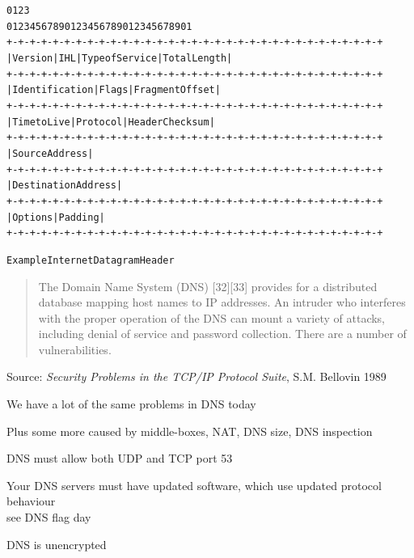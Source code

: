\documentclass[Screen16to9,17pt]{foils}
\begin{document}

\begin{alltt}
\small
    0                   1                   2                   3
    0 1 2 3 4 5 6 7 8 9 0 1 2 3 4 5 6 7 8 9 0 1 2 3 4 5 6 7 8 9 0 1
   +-+-+-+-+-+-+-+-+-+-+-+-+-+-+-+-+-+-+-+-+-+-+-+-+-+-+-+-+-+-+-+-+
   |Version|  IHL  |Type of Service|          Total Length         |
   +-+-+-+-+-+-+-+-+-+-+-+-+-+-+-+-+-+-+-+-+-+-+-+-+-+-+-+-+-+-+-+-+
   |         Identification        |Flags|      Fragment Offset    |
   +-+-+-+-+-+-+-+-+-+-+-+-+-+-+-+-+-+-+-+-+-+-+-+-+-+-+-+-+-+-+-+-+
   |  Time to Live |    Protocol   |         Header Checksum       |
   +-+-+-+-+-+-+-+-+-+-+-+-+-+-+-+-+-+-+-+-+-+-+-+-+-+-+-+-+-+-+-+-+
   |                       Source Address                          |
   +-+-+-+-+-+-+-+-+-+-+-+-+-+-+-+-+-+-+-+-+-+-+-+-+-+-+-+-+-+-+-+-+
   |                    Destination Address                        |
   +-+-+-+-+-+-+-+-+-+-+-+-+-+-+-+-+-+-+-+-+-+-+-+-+-+-+-+-+-+-+-+-+
   |                    Options                    |    Padding    |
   +-+-+-+-+-+-+-+-+-+-+-+-+-+-+-+-+-+-+-+-+-+-+-+-+-+-+-+-+-+-+-+-+

                    Example Internet Datagram Header
\end{alltt}



\begin{quote}
The Domain Name System (DNS) [32][33] provides for a distributed database mapping host names to IP
addresses. An intruder who interferes with the proper operation of the DNS can mount a variety of
attacks, including denial of service and password collection. There are a number of vulnerabilities.
\end{quote}
Source: \emph{Security Problems in the TCP/IP Protocol Suite}, S.M. Bellovin 1989\\

\begin{list1}
\item We have a lot of the same problems in DNS today
\item Plus some more caused by middle-boxes, NAT, DNS size, DNS inspection
\begin{list2}
\item DNS must allow both UDP and TCP port 53
\item Your DNS servers must have updated software, which use updated protocol behaviour \\
see DNS flag day 
\item DNS is unencrypted
\end{list2}
\end{list1}
\end{document}
